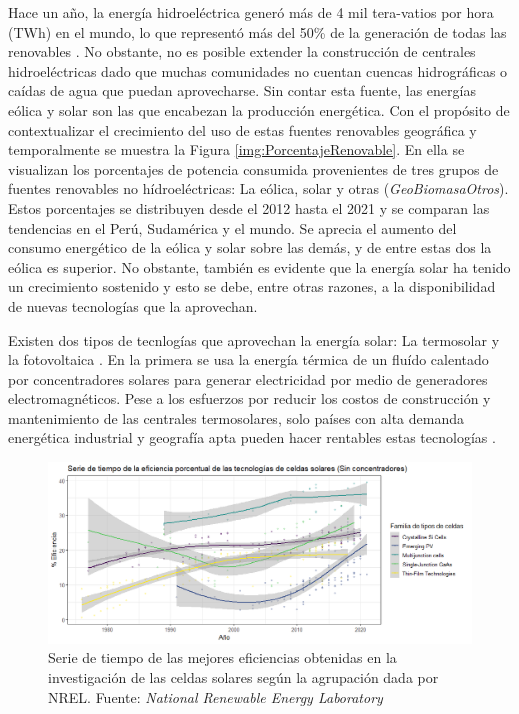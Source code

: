 Hace un año, la energía hidroeléctrica generó más de 4 mil tera-vatios por hora (TWh) en el mundo, lo que representó más del 50\% de la generación de todas las renovables \cite{irena2022international}. No obstante, no es posible extender la construcción de centrales hidroeléctricas dado que muchas comunidades no cuentan cuencas hidrográficas o caídas de agua que puedan aprovecharse. Sin contar esta fuente, las energías eólica y solar son las que encabezan la producción energética. Con el propósito de contextualizar el crecimiento del uso de estas fuentes renovables geográfica y temporalmente se muestra la Figura \ref{img:PorcentajeRenovable}. En ella se visualizan los porcentajes de potencia consumida provenientes de tres grupos de fuentes renovables no hídroeléctricas: La eólica, solar y otras (\textit{GeoBiomasaOtros}). Estos porcentajes se distribuyen desde el 2012 hasta el 2021 y se comparan las tendencias en el Perú, Sudamérica y el mundo. Se aprecia el aumento del consumo energético de la eólica y solar sobre las demás, y de entre estas dos la eólica es superior. No obstante, también es evidente que la energía solar ha tenido un crecimiento sostenido y esto se debe, entre otras razones, a la disponibilidad de nuevas tecnologías que la aprovechan.



Existen dos tipos de tecnlogías que aprovechan la energía solar: La termosolar y la fotovoltaica \cite{hammarstrom2012}. En la primera se usa la energía térmica de un fluído calentado por concentradores solares para generar electricidad por medio de generadores electromagnéticos. Pese a los esfuerzos por reducir los costos de construcción y mantenimiento de las centrales termosolares, solo países con alta demanda energética industrial y geografía apta pueden hacer rentables estas tecnologías \cite{xu2022concentrated}.

\begin{figure}[h!]
    \label{img:SerieTiempo}
    \includegraphics[scale=0.6]{img/SerieTiempo.png}
    \caption{Serie de tiempo de las mejores eficiencias obtenidas en la investigación de las celdas solares según la agrupación dada por NREL.
    Fuente: \textit{National Renewable Energy Laboratory} \cite{owidenergy}}
\end{figure}

